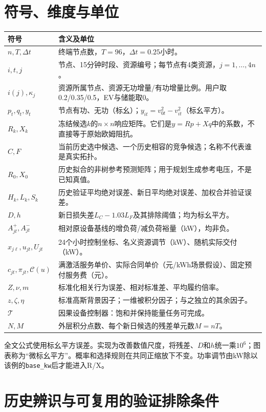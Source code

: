 \documentclass[UTF8,a4paper,11pt]{ctexart}
\newcommand{\Tcal}{\mathcal T}\newcommand{\ind}{\mathbf 1}
\begin{document}
\section{符号、维度与单位}
\begin{longtable}{p{}p{}}
\toprule 符号&含义及单位\\\midrule\endhead
$n,T,\Delta t$&终端节点数，$T=96$，$\Delta t=0.25$小时。\\
$i,t,j$&节点、15分钟时段、资源编号；每节点有4类资源，$j=1,\ldots,4n$。\\
$i(j),\kappa_j$&资源所属节点、资源无功增量/有功增量比例。用户取0.2/0.35/0.5，EV与储能取0。\\
$p_t,q_t,y_t$&节点有功、无功（标幺）；$y_{it}=v_{0t}^2-v_{it}^2$（标幺平方）。\\
$R_k,X_k$&冻结候选$k$的$n\times n$响应矩阵。它们是$y=Rp+Xq$中的系数，不直接等于原始欧姆阻抗。\\
$C,F$&当前历史选中候选、一个历史相容的竞争候选；名称不代表谁是真实拓扑。\\
$R_0,X_0$&历史拟合的非树参考预测矩阵；用于规划生成参考电压，不是已知真值。\\
$H_k,L_k,S_k$&历史验证平均绝对误差、新日平均绝对误差、加权合并验证误差。\\
$D,h$&新日损失差$L_C-1.03L_F$及其排除阈值；均为标幺平方。\\
$A_{jt}^+,A_{jt}^-$&相对原设备基线的增负荷/减负荷裕量（kW），均非负。\\
$x_{j\ell},u_{jt},U_{jt}$&24个小时控制坐标、名义资源调节（kW）、随机实际交付（kW）。\\
$c_{jt},\pi_{jt},\mathcal C(u)$&满激活服务单价、实际合同单价（元/kWh场景假设）、固定预付服务费（元）。\\
$Z,\nu,m$&标准化相关行为误差、相对标准差、平均履约倍率。\\
$z,\zeta,\eta$&标准高斯背景因子；一维被积分因子；与之独立的其余因子。\\
$\Tcal$&因果设备控制器：饱和并保持能量任务可完成。\\
$N,M$&外层积分点数、每个新日候选的残差单元数$M=nT$。\\
\bottomrule
\end{longtable}
全文公式使用标幺平方误差。实现为改善数值尺度，将残差、$D$和$h$统一乘$10^6$；图表称为“微标幺平方”。概率和选择规则在共同正缩放下不变。功率调节由kW除以该例的\texttt{base\_kw}后才能进入R/X。

\section{历史辨识与可复用的验证排除条件}
\end{document}
